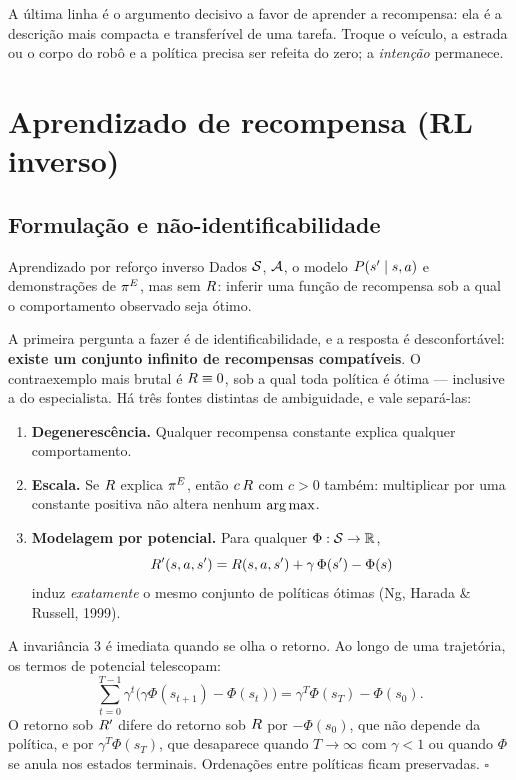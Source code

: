 \documentclass[11pt, a4paper]{article}
\newcommand{\polE}{\pol^{E}}
\begin{document}
A última linha é o argumento decisivo a favor de aprender a recompensa: ela é a
descrição mais compacta e transferível de uma tarefa. Troque o veículo, a
estrada ou o corpo do robô e a política precisa ser refeita do zero; a
\emph{intenção} permanece.

\section{Aprendizado de recompensa (RL inverso)}

\subsection{Formulação e não-identificabilidade}

\begin{defbox}{Aprendizado por reforço inverso}
Dados $\mathcal{S}$, $\mathcal{A}$, o modelo $P(s'\mid s,a)$ e demonstrações de $\polE$, mas
sem $R$: inferir uma função de recompensa sob a qual o comportamento
observado seja ótimo.
\end{defbox}

A primeira pergunta a fazer é de identificabilidade, e a resposta é
desconfortável: \textbf{existe um conjunto infinito de recompensas compatíveis}.
O contraexemplo mais brutal é $R \equiv 0$, sob a qual toda política é ótima
--- inclusive a do especialista. Há três fontes distintas de ambiguidade, e vale
separá-las:

\begin{enumerate}
  \item \textbf{Degenerescência.} Qualquer recompensa constante explica qualquer
    comportamento.
  \item \textbf{Escala.} Se $R$ explica $\polE$, então $c\,R$ com $c>0$
    também: multiplicar por uma constante positiva não altera nenhum
    $\operatorname*{arg\,max}$.
  \item \textbf{Modelagem por potencial.} Para qualquer $\Phi:\mathcal{S}\to\mathbb{R}$,
    \[
      R'(s,a,s') = R(s,a,s') + \gamma\,\Phi(s') - \Phi(s)
    \]
    induz \emph{exatamente} o mesmo conjunto de políticas ótimas
    (Ng, Harada \& Russell, 1999).
\end{enumerate}

\begin{provabox}
A invariância 3 é imediata quando se olha o retorno. Ao longo de uma trajetória,
os termos de potencial telescopam:
\[
  \sum_{t=0}^{T-1}\gamma^{t}\bigl(\gamma\Phi(s_{t+1}) - \Phi(s_t)\bigr)
  = \gamma^{T}\Phi(s_T) - \Phi(s_0).
\]
O retorno sob $R'$ difere do retorno sob $R$ por $-\Phi(s_0)$, que não
depende da política, e por $\gamma^{T}\Phi(s_T)$, que desaparece quando
$T\to\infty$ com $\gamma<1$ ou quando $\Phi$ se anula nos estados terminais.
Ordenações entre políticas ficam preservadas. \hfill$\square$
\end{provabox}
\end{document}
